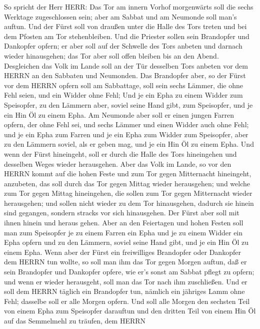  So spricht der Herr HERR: Das Tor am innern Vorhof
morgenwärts soll die sechs Werktage zugeschlossen sein; aber am Sabbat
und am Neumonde soll man's auftun.  Und der Fürst soll von
draußen unter die Halle des Tors treten und bei dem Pfosten am Tor
stehenbleiben. Und die Priester sollen sein Brandopfer und Dankopfer
opfern; er aber soll auf der Schwelle des Tors anbeten und darnach
wieder hinausgehen; das Tor aber soll offen bleiben bis an den Abend.
 Desgleichen das Volk im Lande soll an der Tür desselben
Tors anbeten vor dem HERRN an den Sabbaten und Neumonden. 
Das Brandopfer aber, so der Fürst vor dem HERRN opfern soll am
Sabbattage, soll sein sechs Lämmer, die ohne Fehl seien, und ein Widder
ohne Fehl;  Und je ein Epha zu einem Widder zum Speisopfer,
zu den Lämmern aber, soviel seine Hand gibt, zum Speisopfer, und je ein
Hin Öl zu einem Epha.  Am Neumonde aber soll er einen jungen
Farren opfern, der ohne Fehl sei, und sechs Lämmer und einen Widder auch
ohne Fehl;  und je ein Epha zum Farren und je ein Epha zum
Widder zum Speisopfer, aber zu den Lämmern soviel, als er geben mag, und
je ein Hin Öl zu einem Epha.  Und wenn der Fürst hineingeht,
soll er durch die Halle des Tors hineingehen und desselben Weges wieder
herausgehen.  Aber das Volk im Lande, so vor den HERRN kommt
auf die hohen Feste und zum Tor gegen Mitternacht hineingeht, anzubeten,
das soll durch das Tor gegen Mittag wieder herausgehen; und welche zum
Tor gegen Mittag hineingehen, die sollen zum Tor gegen Mitternacht
wieder herausgehen; und sollen nicht wieder zu dem Tor hinausgehen,
dadurch sie hinein sind gegangen, sondern stracks vor sich hinausgehen.
 Der Fürst aber soll mit ihnen hinein und heraus gehen.
 Aber an den Feiertagen und hohen Festen soll man zum
Speisopfer je zu einem Farren ein Epha und je zu einem Widder ein Epha
opfern und zu den Lämmern, soviel seine Hand gibt, und je ein Hin Öl zu
einem Epha.  Wenn aber der Fürst ein freiwilliges
Brandopfer oder Dankopfer dem HERRN tun wollte, so soll man ihm das Tor
gegen Morgen auftun, daß er sein Brandopfer und Dankopfer opfere, wie
er's sonst am Sabbat pflegt zu opfern; und wenn er wieder herausgeht,
soll man das Tor nach ihm zuschließen.  Und er soll dem
HERRN täglich ein Brandopfer tun, nämlich ein jähriges Lamm ohne Fehl;
dasselbe soll er alle Morgen opfern.  Und soll alle Morgen
den sechsten Teil von einem Epha zum Speisopfer darauftun und den
dritten Teil von einem Hin Öl auf das Semmelmehl zu träufen, dem HERRN
